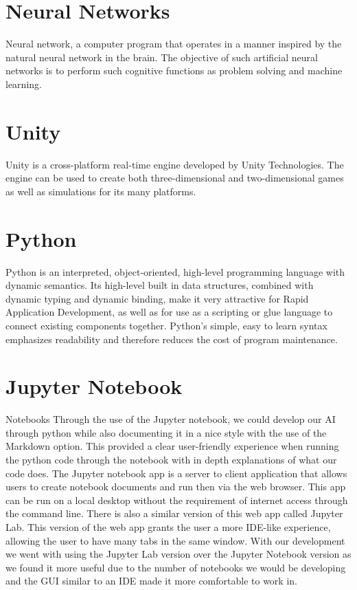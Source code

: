 \section{Neural Networks}
Neural network, a computer program that operates in a manner inspired by the natural neural network in the brain. The objective of such artificial neural networks is to perform such cognitive functions as problem solving and machine learning.
\section{Unity}
Unity is a cross-platform real-time engine developed by Unity Technologies. The engine can be used to create both three-dimensional and two-dimensional games as well as simulations for its many platforms.
\section{Python}
Python is an interpreted, object-oriented, high-level programming language with dynamic semantics. Its high-level built in data structures, combined with dynamic typing and dynamic binding, make it very attractive for Rapid Application Development, as well as for use as a scripting or glue language to connect existing components together. Python's simple, easy to learn syntax emphasizes readability and therefore reduces the cost of program maintenance. 

\section{Jupyter Notebook}
Notebooks
Through the use of the Jupyter notebook, we could develop our AI through python while also documenting it in a nice style with the use of the Markdown option. This provided a clear user-friendly experience when running the python code through the notebook with in depth explanations of what our code does. The Jupyter notebook app is a server to client application that allows users to create notebook documents and run then via the web browser. This app can be run on a local desktop without the requirement of internet access through the command line. There is also a similar version of this web app called Jupyter Lab. This version of the web app grants the user a more IDE-like experience, allowing the user to have many tabs in the same window. With our development we went with using the Jupyter Lab version over the Jupyter Notebook version as we found it more useful due to the number of notebooks we would be developing and the GUI similar to an IDE made it more comfortable to work in. 

